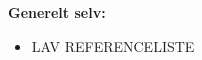 \documentclass[a4paper,11pt,oneside]{memoir}
\newcommand{\R}{\ensuremath{\mathbb{R}}}
\begin{document}
\textbf{Generelt selv:}
\begin{itemize}
\item LAV REFERENCELISTE
\end{itemize}


\newpage






\end{document}
